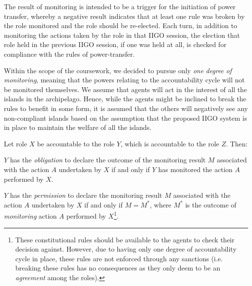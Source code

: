 
The result of monitoring is intended to be a trigger for the initiation of power transfer, whereby a negative result indicates that at least one rule was broken by the role monitored and the role should be re-elected. Each turn, in addition to monitoring the actions taken by the role in that IIGO session, the election that role held in the previous IIGO session, if one was held at all, is checked for compliance with the rules of power-transfer.

Within the scope of the coursework, we decided to pursue only \emph{one degree of monitoring}, meaning that the powers relating to the accountability cycle will not be monitored themselves. We assume that agents will act in the interest of all the islands in the archipelago. Hence, while the agents might be inclined to break the rules to benefit in some form, it is assumed that the others will negatively see any non-compliant islands based on the assumption that the proposed IIGO system is in place to maintain the welfare of all the islands.

Let role $X$ be accountable to the role $Y$, which is accountable to the role $Z$. Then:
\begin{rule_IIGO}
$Y$ has the \emph{obligation} to declare the outcome of the monitoring result $M$ associated with the action $A$ undertaken by $X$ if and only if $Y$ has monitored the action $A$ performed by $X$. 
\end{rule_IIGO}
\begin{rule_IIGO}
$Y$ has the \emph{permission} to declare the monitoring result $M$ associated with the action $A$ undertaken by $X$ if and only if $M = M^{*}$, where $M^{*}$ is the outcome of \emph{monitoring} action $A$ performed by $X$\footnote{These constitutional rules should be available to the agents to check their decision against. However, due to having only one degree of accountability cycle in place, these rules are not enforced through any sanctions (i.e. breaking these rules has no consequences as they only deem to be an \emph{agreement} among the roles).}.
\end{rule_IIGO}


